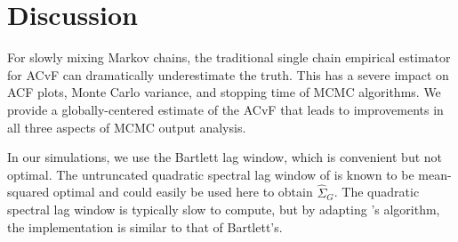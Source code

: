 \documentclass[11pt]{article}
\theoremstyle{remark}
\begin{document}
 
\section{Discussion} \label{sec:discussion}



For slowly mixing Markov chains, the traditional single chain empirical estimator for ACvF can dramatically underestimate the truth. This has a severe impact on ACF plots, Monte Carlo variance, and stopping time of MCMC algorithms. We provide a globally-centered estimate of the ACvF that leads to improvements in all three aspects of MCMC output analysis.





In our simulations, we use the Bartlett lag window, which is convenient but not optimal. The untruncated quadratic spectral lag window of \cite{andr:1991} is known to be mean-squared optimal and could easily be used here to obtain $\hat{\Sigma}_G$. The quadratic spectral lag window is typically slow to compute, but by adapting  \citeauthor{heberle2017fast}'s algorithm, the implementation is similar to that of Bartlett's. 
\end{document}
